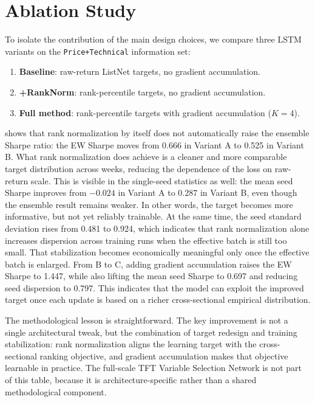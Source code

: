 \section{Ablation Study}
\label{sec:analysis:ablation}

To isolate the contribution of the main design choices, we compare three LSTM
variants on the \texttt{Price+Technical} information set:

\begin{enumerate}[label=(\Alph*)]
  \item \textbf{Baseline}: raw-return ListNet targets, no gradient accumulation.
  \item \textbf{+RankNorm}: rank-percentile targets, no gradient accumulation.
  \item \textbf{Full method}: rank-percentile targets with gradient accumulation ($K=4$).
\end{enumerate}



 shows that rank normalization by itself does not
automatically raise the ensemble Sharpe ratio: the EW Sharpe moves from
0.666 in Variant A to 0.525 in Variant B.
What rank normalization does achieve is a cleaner and more comparable target
distribution across weeks, reducing the dependence of the loss on raw-return
scale.
This is visible in the single-seed statistics as well:
the mean seed Sharpe improves from $-0.024$ in Variant A to $0.287$ in
Variant B, even though the ensemble result remains weaker.
In other words, the target becomes more informative, but not yet reliably
trainable.
At the same time, the seed standard deviation rises from 0.481 to 0.924,
which indicates that rank normalization alone increases dispersion across
training runs when the effective batch is still too small.
That stabilization becomes economically meaningful only once the effective
batch is enlarged.
From B to C, adding gradient accumulation raises the EW Sharpe to 1.447,
while also lifting the mean seed Sharpe to 0.697 and reducing seed
dispersion to 0.797.
This indicates that the model can exploit the improved target once each
update is based on a richer cross-sectional empirical distribution.

The methodological lesson is straightforward.
The key improvement is not a single architectural tweak, but the combination
of target redesign and training stabilization:
rank normalization aligns the learning target with the cross-sectional
ranking objective, and gradient accumulation makes that objective learnable
in practice.
The full-scale TFT Variable Selection Network is not part of this table,
because it is architecture-specific rather than a shared methodological
component.

